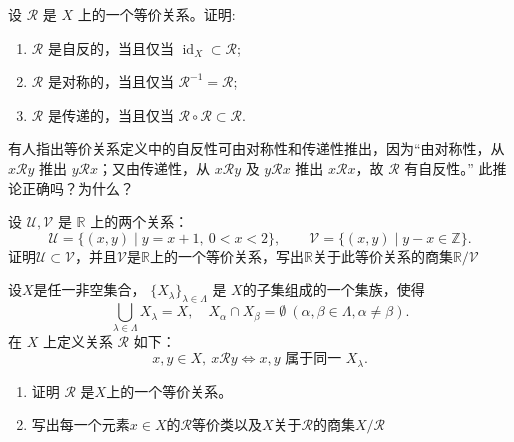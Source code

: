 \begin{exercise}
	\item 设 $\mathscr{R}$ 是 $X$ 上的一个等价关系。证明:
	\begin{enumerate}[label=\arabic*)]
		\item $\mathscr{R}$ 是自反的，当且仅当 $\operatorname{id}_X\subset\mathscr{R}$;
		\item $\mathscr{R}$ 是对称的，当且仅当 $\mathscr{R}^{-1}=\mathscr{R}$;
		\item $\mathscr{R}$ 是传递的，当且仅当 $\mathscr{R}\circ\mathscr{R}\subset\mathscr{R}$.
	\end{enumerate}
\end{exercise}

\begin{exercise}
	\item 有人指出等价关系定义中的自反性可由对称性和传递性推出，因为“由对称性，从 $x\mathscr{R}y$ 推出 $y\mathscr{R}x$；又由传递性，从 $x\mathscr{R}y$ 及 $y\mathscr{R}x$ 推出 $x\mathscr{R}x$，故 $\mathscr{R}$ 有自反性。”
	此推论正确吗？为什么？
\end{exercise}


\begin{exercise}
	\item 设 $\mathscr{U}, \mathscr{V}$ 是 $\mathbb{R}$ 上的两个关系：
	\[
	\mathscr{U} = \{(x, y) \mid y = x + 1,\ 0 < x < 2\},\qquad
	\mathscr{V} = \{(x, y) \mid y - x \in \mathbb{Z}\}.
	\]
	证明$\mathscr{U}\subset\mathscr{V}$，并且$\mathscr{V}$是$\mathbb{R}$上的一个等价关系，写出$\mathbb{R}$关于此等价关系的商集$\mathbb{R}/\mathscr{V}$
\end{exercise}

\begin{exercise}
	\item 设$X$是任一非空集合， $\{X_\lambda\}_{\lambda\in\Lambda}$ 是 $X$的子集组成的一个集族，使得
	\[
	\bigcup_{\lambda \in \Lambda} X_{\lambda} = X,\quad X_{\alpha} \cap X_{\beta} = \emptyset\ (\alpha,\beta \in \Lambda,\alpha\neq\beta).
	\]
	在 $X$ 上定义关系 $\mathscr{R}$ 如下：
	\[
	x, y \in X,\ x \mathscr{R} y \iff x,y\text{ 属于同一 }X_\lambda.
	\]
	\begin{enumerate}[label=\arabic*)]
		\item 证明 $\mathscr{R}$ 是$X$上的一个等价关系。
		\item 写出每一个元素$x\in X$的$\mathscr{R}$等价类以及$X$关于$\mathscr{R}$的商集$X/\mathscr{R}$
	\end{enumerate}
\end{exercise}

